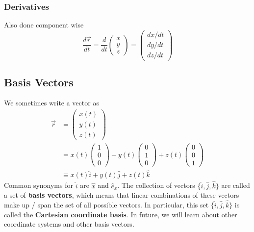 \documentclass{article}
\begin{document}
\subsubsection{Derivatives}
Also done component wise
$$\frac{d\vec{r}}{dt} = \frac{d}{dt}\left(
    \begin{array}{c}  
         x \\
         y \\
         z
    \end{array} 
    \right) = \left(
    \begin{array}{c}  
         dx/dt \\
         dy/dt \\
         dz/dt
    \end{array} 
    \right)
$$
\subsection{Basis Vectors}
We sometimes write a vector as 
\begin{align}
    \vec{r} &= \left(
    \begin{array}{c}  
         x(t) \\
         y(t) \\
         z(t)
    \end{array} 
    \right) \\
    &= x(t) \left(
    \begin{array}{c}  
         1 \\
         0 \\
         0
    \end{array} 
    \right) + y(t) \left(
    \begin{array}{c}  
         0 \\
         1 \\
         0
    \end{array} 
    \right) + z(t) \left(
    \begin{array}{c}  
         0 \\
         0 \\
         1
    \end{array} 
    \right)  \\
    &\equiv x(t) \hat{i} + y(t) \hat{j}  + z(t) \hat{k} 
\end{align}
Common synonyms for $\hat{i}$ are $\hat{x}$ and $\hat{e}_x$. The collection of vectors $\{ \hat i, \hat j, \hat k \}$ are called a set of \textbf{basis vectors}, which means that linear combinations of these vectors make up / span the set of all possible vectors. In particular, this set $\{ \hat i, \hat j, \hat k \}$ is called the \textbf{Cartesian coordinate basis}. In future, we will learn about other coordinate systems and other basis vectors.
\end{document}
